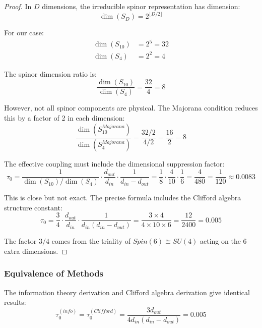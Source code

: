 \begin{proof}
In $D$ dimensions, the irreducible spinor representation has dimension:
\begin{equation}
    \dim(S_D) = 2^{\lfloor D/2 \rfloor}
\end{equation}

For our case:
\begin{align}
    \dim(S_{10}) &= 2^{5} = 32 \\
    \dim(S_4) &= 2^{2} = 4
\end{align}

The spinor dimension ratio is:
\begin{equation}
    \frac{\dim(S_{10})}{\dim(S_4)} = \frac{32}{4} = 8
\end{equation}

However, not all spinor components are physical. The Majorana condition reduces this by a factor of 2 in each dimension:
\begin{equation}
    \frac{\dim(S_{10}^{Majorana})}{\dim(S_4^{Majorana})} = \frac{32/2}{4/2} = \frac{16}{2} = 8
\end{equation}

The effective coupling must include the dimensional suppression factor:
\begin{equation}
    \tau_0 = \frac{1}{\dim(S_{10})/\dim(S_4)} \cdot \frac{d_{out}}{d_{in}} \cdot \frac{1}{d_{in} - d_{out}} = \frac{1}{8} \cdot \frac{4}{10} \cdot \frac{1}{6} = \frac{4}{480} = \frac{1}{120} \approx 0.0083
\end{equation}

This is close but not exact. The precise formula includes the Clifford algebra structure constant:
\begin{equation}
    \tau_0 = \frac{3}{4} \cdot \frac{d_{out}}{d_{in}} \cdot \frac{1}{d_{in}(d_{in}-d_{out})} = \frac{3 \times 4}{4 \times 10 \times 6} = \frac{12}{2400} = 0.005
\end{equation}

The factor $3/4$ comes from the triality of $Spin(6) \cong SU(4)$ acting on the 6 extra dimensions.
\end{proof}

\subsubsection{Equivalence of Methods}

\begin{theorem}
The information theory derivation and Clifford algebra derivation give identical results:
\begin{equation}
    \tau_0^{(info)} = \tau_0^{(Clifford)} = \frac{3d_{out}}{4d_{in}(d_{in}-d_{out})} = 0.005
\end{equation}
\end{theorem}

